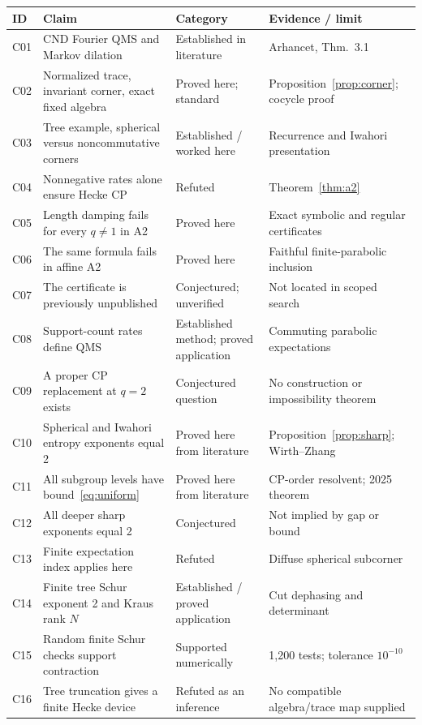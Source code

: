 \documentclass[11pt]{article}
\theoremstyle{remark}\newtheorem{remark}[definition]{Remark}
\begin{document}
{\small\setlength{\tabcolsep}{8pt}\renewcommand{\arraystretch}{1.2}
\begin{longtable}{p{.07\linewidth}p{.37\linewidth}p{.20\linewidth}p{.22\linewidth}}
\toprule ID & Claim & Category & Evidence / limit\\\midrule
C01 & CND Fourier QMS and Markov dilation & Established in literature & Arhancet, Thm.~3.1\\
C02 & Normalized trace, invariant corner, exact fixed algebra & Proved here; standard & Proposition~\ref{prop:corner}; cocycle proof\\
C03 & Tree example, spherical versus noncommutative corners & Established / worked here & Recurrence and Iwahori presentation\\
C04 & Nonnegative rates alone ensure Hecke CP & Refuted & Theorem~\ref{thm:a2}\\
C05 & Length damping fails for every $q\ne1$ in A2 & Proved here & Exact symbolic and regular certificates\\
C06 & The same formula fails in affine A2 & Proved here & Faithful finite-parabolic inclusion\\
C07 & The certificate is previously unpublished & Conjectured; unverified & Not located in scoped search\\
C08 & Support-count rates define QMS & Established method; proved application & Commuting parabolic expectations\\
C09 & A proper CP replacement at $q=2$ exists & Conjectured question & No construction or impossibility theorem\\
C10 & Spherical and Iwahori entropy exponents equal 2 & Proved here from literature & Proposition~\ref{prop:sharp}; Wirth--Zhang\\
C11 & All subgroup levels have bound~\eqref{eq:uniform} & Proved here from literature & CP-order resolvent; 2025 theorem\\
C12 & All deeper sharp exponents equal 2 & Conjectured & Not implied by gap or bound\\
C13 & Finite expectation index applies here & Refuted & Diffuse spherical subcorner\\
C14 & Finite tree Schur exponent 2 and Kraus rank $N$ & Established / proved application & Cut dephasing and determinant\\
C15 & Random finite Schur checks support contraction & Supported numerically & 1,200 tests; tolerance $10^{-10}$\\
C16 & Tree truncation gives a finite Hecke device & Refuted as an inference & No compatible algebra/trace map supplied\\

\end{longtable}}
\end{document}
